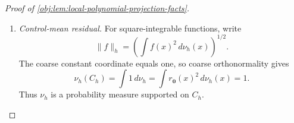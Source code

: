 \documentclass[11pt]{article}
\begin{document}
\begin{proof}[Proof of \cref{obj:lem:local-polynomial-projection-facts}]
\begin{enumerate}
The coordinate bound gives, for every \(x\in\mathbb R^d\),
\[
|b_{\mathbf j,\kappa}(x)|\le\sqrt{J^d}\,4^d.
\]
The constant coordinate on a cell is
\[
b_{\mathbf j,\mathbf0}(x)=\sqrt{J^d}\,\mathbf1_{D_{\mathbf j}}(x).
\]
Consequently,
\[
|b_{\mathbf j,\kappa}(x)|
 \le\frac{4^d}{\sqrt{J^d}}b_{\mathbf j,\mathbf0}(x)^2,
\qquad
\int|b_{\mathbf j,\kappa}(x)|\,d\nu_h(x)
 \le\frac{4^d}{\sqrt{J^d}},
\]
where the second inequality uses
\(\int b_{\mathbf j,\mathbf0}^2\,d\nu_h=1\).

If \(x\in D_{\mathbf j}\), disjointness reduces the kernel to
\[
K_J(x,x')
 =\sum_{\kappa\in\mathcal U_{\mathrm{coarse}}}
 b_{\mathbf j,\kappa}(x)b_{\mathbf j,\kappa}(x').
\]
The triangle inequality and the preceding bounds therefore give
\[
\begin{aligned}
\int|K_J(x,x')|\,d\nu_h(x')
&\le
 \sum_{\kappa\in\mathcal U_{\mathrm{coarse}}}
 |b_{\mathbf j,\kappa}(x)|
 \int|b_{\mathbf j,\kappa}(x')|\,d\nu_h(x')\\
&\le q\bigl(\sqrt{J^d}\,4^d\bigr)
          \frac{4^d}{\sqrt{J^d}}
 =q(4^d)^2.
\end{aligned}
\]
For \(x\) outside all cells, \(K_J(x,x')=0\), so the same bound holds there.

There are \(|\mathcal Z_J|=J^d\) cells and \(q\) coordinates per cell;
hence the fine index set has \(qJ^d\) elements. Expanding the squared
finite kernel and factoring the product integrals yields
\[
\begin{aligned}
\iint K_J(x,x')^2\,d\nu_h(x)\,d\nu_h(x')
&=
 \sum_{\mathbf j,\kappa}\sum_{\mathbf j',\kappa'}
 \left(\int
 b_{\mathbf j,\kappa}(x)b_{\mathbf j',\kappa'}(x)\,d\nu_h(x)\right)^2\\
&=qJ^d=k.
\end{aligned}
\]
All terms are integrable by the square integrability of the basis coordinates.
Define
\[
C_{\mathrm B}
 =\max\{\sqrt q\,4^d+1,\ q(4^d)^2+1\}>0.
\]
We have proved
\[
\sup_{x\in C_h}\|r(x)\|_2\le C_{\mathrm B},
\qquad
\sup_{x\in C_h}\int|K_J(x,x')|\,d\nu_h(x')\le C_{\mathrm B},
\]
together with the exact squared-kernel identity.

\item \emph{Control-mean residual.}
For square-integrable functions, write
\[
\|f\|_h=\left(\int f(x)^2\,d\nu_h(x)\right)^{1/2}.
\]
The coarse constant coordinate equals one, so coarse orthonormality gives
\[
\nu_h(C_h)=\int1\,d\nu_h
 =\int r_{\mathbf0}(x)^2\,d\nu_h(x)=1.
\]
Thus \(\nu_h\) is a probability measure supported on \(C_h\).


\end{enumerate}
\end{proof}
\end{document}
